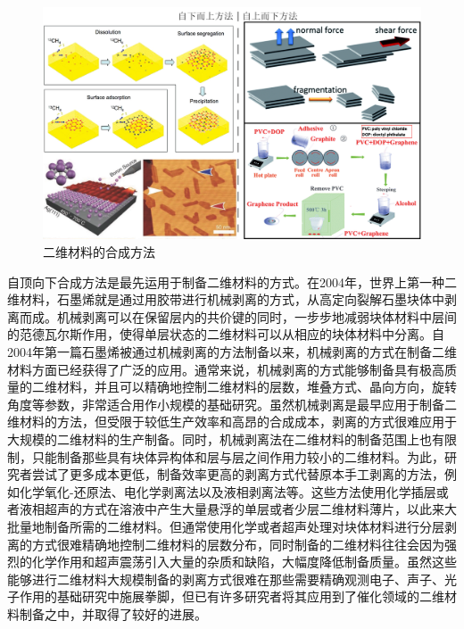     \begin{figure}[htb]
        \includegraphics{pic/INTRO_growth_upAndDown.png}
        \caption{二维材料的合成方法}
    \end{figure}

    自顶向下合成方法是最先运用于制备二维材料的方式。在2004年，世界上第一种二维材料，石墨烯就是通过用胶带进行机械剥离的方式，从高定向裂解石墨块体中剥离而成。机械剥离可以在保留层内的共价键的同时，一步步地减弱块体材料中层间的范德瓦尔斯作用，使得单层状态的二维材料可以从相应的块体材料中分离。自2004年第一篇石墨烯被通过机械剥离的方法制备以来，机械剥离的方式在制备二维材料方面已经获得了广泛的应用。通常来说，机械剥离的方式能够制备具有极高质量的二维材料，并且可以精确地控制二维材料的层数，堆叠方式、晶向方向，旋转角度等参数，非常适合用作小规模的基础研究。虽然机械剥离是最早应用于制备二维材料的方法，但受限于较低生产效率和高昂的合成成本，剥离的方式很难应用于大规模的二维材料的生产制备。同时，机械剥离法在二维材料的制备范围上也有限制，只能制备那些具有块体异构体和层与层之间作用力较小的二维材料。为此，研究者尝试了更多成本更低，制备效率更高的剥离方式代替原本手工剥离的方法，例如化学氧化-还原法、电化学剥离法以及液相剥离法等。这些方法使用化学插层或者液相超声的方式在溶液中产生大量悬浮的单层或者少层二维材料薄片，以此来大批量地制备所需的二维材料。但通常使用化学或者超声处理对块体材料进行分层剥离的方式很难精确地控制二维材料的层数分布，同时制备的二维材料往往会因为强烈的化学作用和超声震荡引入大量的杂质和缺陷，大幅度降低制备质量。虽然这些能够进行二维材料大规模制备的剥离方式很难在那些需要精确观测电子、声子、光子作用的基础研究中施展拳脚，但已有许多研究者将其应用到了催化领域的二维材料制备之中，并取得了较好的进展。

